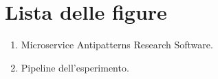 \chapter*{Lista delle figure}
\begin{enumerate}
    \item Microservice Antipatterns Research Software.
    \item Pipeline dell'esperimento.
\end{enumerate}